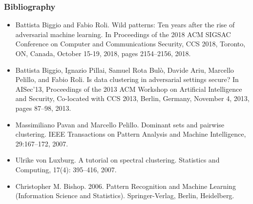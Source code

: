 \documentclass{beamer}
\begin{document}
\begin{frame}
	\frametitle{Bibliography}
	\changefontsizes{6.5pt}
	\begin{itemize}
		\item {{Battista Biggio and Fabio Roli. Wild patterns: Ten years after the rise of adversarial
		machine learning. In Proceedings of the 2018 ACM SIGSAC Conference on Computer and
		Communications Security, CCS 2018, Toronto, ON, Canada, October 15-19, 2018, pages
		2154–2156, 2018.}}\\
	
	
		\item {{Battista Biggio, Ignazio Pillai, Samuel Rota Bulò, Davide Ariu, Marcello Pelillo, and Fabio
				Roli. Is data clustering in adversarial settings secure? In AISec’13, Proceedings of the 2013
				ACM Workshop on Artificial Intelligence and Security, Co-located with CCS 2013, Berlin,
				Germany, November 4, 2013, pages 87–98, 2013.}}\\
			
		\item {{Massimiliano Pavan and Marcello Pelillo. Dominant sets and pairwise clustering. IEEE
				Transactions on Pattern Analysis and Machine Intelligence, 29:167–172, 2007.}}\\
			
		\item {{Ulrike von Luxburg. A tutorial on spectral clustering. Statistics and Computing, 17(4):
				395–416, 2007.}}
			
		\item {{Christopher M. Bishop. 2006. Pattern Recognition and Machine Learning (Information Science and Statistics). Springer-Verlag, Berlin, Heidelberg.
		}}
	\end{itemize}
\end{frame}
\end{document}
